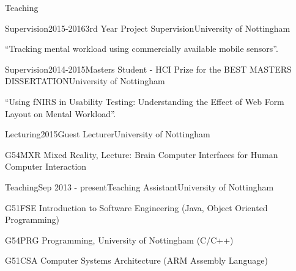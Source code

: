 \documentclass{resume} %
\begin{document}
\begin{rSection}{Teaching}
    \begin{rSubsection}{Supervision}{2015-2016}{3rd Year Project Supervision}{University of Nottingham}
        \item  ``Tracking mental workload using commercially available mobile sensors''.
    \end{rSubsection}

    \begin{rSubsection}{Supervision}{2014-2015}{Masters Student - HCI Prize for the BEST MASTERS DISSERTATION}{University of Nottingham}
        \item  ``Using fNIRS in Usability Testing: Understanding the Effect of Web Form Layout on Mental Workload''.
    \end{rSubsection}

    \begin{rSubsection}{Lecturing}{2015}{Guest Lecturer}{University of Nottingham}
        \item G54MXR Mixed Reality, Lecture: Brain Computer Interfaces for Human Computer Interaction
    \end{rSubsection}

    \begin{rSubsection}{Teaching}{Sep 2013 - present}{Teaching Assistant}{University of Nottingham}
        \item G51FSE Introduction to Software Engineering (Java, Object Oriented Programming)
        \item G54PRG Programming, University of Nottingham (C/C++)
        \item G51CSA Computer Systems Architecture (ARM Assembly Language)
    \end{rSubsection}


\end{rSection}
\end{document}
